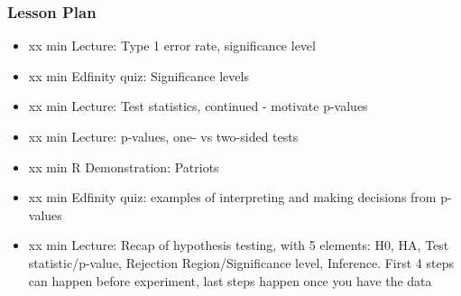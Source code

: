\begin{frame}
    \frametitle{Lesson Plan}
    \begin{itemize}
        \item xx min Lecture: Type 1 error rate, significance level
        \item xx min Edfinity quiz: Significance levels
         
        \item xx min Lecture: Test statistics, continued - motivate p-values
        \item xx min Lecture: p-values, one- vs two-sided tests
        \item xx min R Demonstration: Patriots
        \item xx min Edfinity quiz: examples of interpreting and making decisions from p-values
        \item xx min Lecture: Recap of hypothesis testing, with 5 elements: H0, HA, Test statistic/p-value, Rejection Region/Significance level, Inference. First 4 steps can happen before experiment, last steps happen once you have the data
    \end{itemize}
\end{frame}
            
